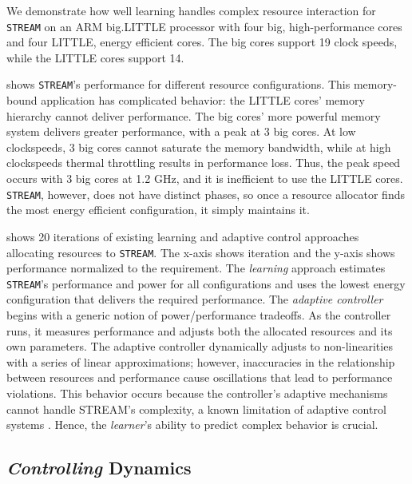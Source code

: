 We demonstrate how well learning handles complex resource interaction
for \texttt{STREAM} on an ARM big.LITTLE processor with four big,
high-performance cores and four LITTLE, energy efficient cores.  The
big cores support 19 clock speeds, while the LITTLE cores support 14.


 shows \texttt{STREAM}'s performance for
different resource configurations.  This memory-bound application has
complicated behavior: the LITTLE cores' memory hierarchy cannot
deliver performance.  The big cores' more powerful memory system
delivers greater performance, with a peak at 3 big cores.  At low
clockspeeds, 3 big cores cannot saturate the memory bandwidth, while
at high clockspeeds thermal throttling results in performance loss.
Thus, the peak speed occurs with 3 big cores at 1.2 GHz, and it is
inefficient to use the LITTLE cores.  \texttt{STREAM}, however, does
not have distinct phases, so once a resource allocator finds the most
energy efficient configuration, it simply maintains it.


 shows 20 iterations of existing learning
\cite{LEO} and adaptive control \cite{POET} approaches allocating
resources to \texttt{STREAM}.  The x-axis shows iteration and the
y-axis shows performance normalized to the requirement.  The
\emph{learning} approach estimates \texttt{STREAM}'s performance and
power for all configurations and uses the lowest energy configuration
that delivers the required performance.  The \emph{adaptive
  controller} begins with a generic notion of power/performance
tradeoffs.  As the controller runs, it measures performance and
adjusts both the allocated resources and its own parameters.  The
adaptive controller dynamically adjusts to non-linearities with a
series of linear approximations; however, inaccuracies in the
relationship between resources and performance cause oscillations that
lead to performance violations.  This behavior occurs because the
controller's adaptive mechanisms cannot handle STREAM's complexity, a
known limitation of adaptive control systems
\cite{ControlWare,POET,ICSE2014}.  Hence, the \emph{learner}'s ability
to predict complex behavior is crucial.

\subsection{\emph{Controlling} Dynamics}

